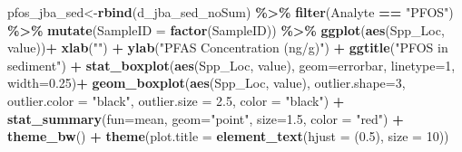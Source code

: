 \documentclass[
]{article}
\newenvironment{Shaded}{\begin{snugshade}}{\end{snugshade}}
\newcommand{\AttributeTok}[1]{\textcolor[rgb]{0.13,0.29,0.53}{#1}}
\newcommand{\DecValTok}[1]{\textcolor[rgb]{0.00,0.00,0.81}{#1}}
\newcommand{\FloatTok}[1]{\textcolor[rgb]{0.00,0.00,0.81}{#1}}
\newcommand{\FunctionTok}[1]{\textcolor[rgb]{0.13,0.29,0.53}{\textbf{#1}}}
\newcommand{\NormalTok}[1]{#1}
\newcommand{\OtherTok}[1]{\textcolor[rgb]{0.56,0.35,0.01}{#1}}
\newcommand{\SpecialCharTok}[1]{\textcolor[rgb]{0.81,0.36,0.00}{\textbf{#1}}}
\newcommand{\StringTok}[1]{\textcolor[rgb]{0.31,0.60,0.02}{#1}}
\begin{document}
\begin{Shaded}
\begin{Highlighting}[]
\NormalTok{pfos\_jba\_sed}\OtherTok{\textless{}{-}}\FunctionTok{rbind}\NormalTok{(d\_jba\_sed\_noSum) }\SpecialCharTok{\%\textgreater{}\%} 
  \FunctionTok{filter}\NormalTok{(Analyte }\SpecialCharTok{==} \StringTok{"PFOS"}\NormalTok{) }\SpecialCharTok{\%\textgreater{}\%} 
  \FunctionTok{mutate}\NormalTok{(}\AttributeTok{SampleID =} \FunctionTok{factor}\NormalTok{(SampleID)) }\SpecialCharTok{\%\textgreater{}\%} 
  \FunctionTok{ggplot}\NormalTok{(}\FunctionTok{aes}\NormalTok{(Spp\_Loc, value))}\SpecialCharTok{+}
    \FunctionTok{xlab}\NormalTok{(}\StringTok{""}\NormalTok{) }\SpecialCharTok{+}
    \FunctionTok{ylab}\NormalTok{(}\StringTok{"PFAS Concentration (ng/g)"}\NormalTok{) }\SpecialCharTok{+}
    \FunctionTok{ggtitle}\NormalTok{(}\StringTok{"PFOS in sediment"}\NormalTok{) }\SpecialCharTok{+}
    \FunctionTok{stat\_boxplot}\NormalTok{(}\FunctionTok{aes}\NormalTok{(Spp\_Loc, value),}
                 \AttributeTok{geom=}\StringTok{\textquotesingle{}errorbar\textquotesingle{}}\NormalTok{, }\AttributeTok{linetype=}\DecValTok{1}\NormalTok{, }\AttributeTok{width=}\FloatTok{0.25}\NormalTok{)}\SpecialCharTok{+}
    \FunctionTok{geom\_boxplot}\NormalTok{(}\FunctionTok{aes}\NormalTok{(Spp\_Loc, value),}
                 \AttributeTok{outlier.shape=}\DecValTok{3}\NormalTok{,}
                 \AttributeTok{outlier.color =} \StringTok{"black"}\NormalTok{,}
                 \AttributeTok{outlier.size =} \FloatTok{2.5}\NormalTok{,}
                 \AttributeTok{color =} \StringTok{"black"}\NormalTok{) }\SpecialCharTok{+} 
    \FunctionTok{stat\_summary}\NormalTok{(}\AttributeTok{fun=}\NormalTok{mean, }\AttributeTok{geom=}\StringTok{"point"}\NormalTok{, }\AttributeTok{size=}\FloatTok{1.5}\NormalTok{, }\AttributeTok{color =} \StringTok{"red"}\NormalTok{) }\SpecialCharTok{+}
    \FunctionTok{theme\_bw}\NormalTok{() }\SpecialCharTok{+}
    \FunctionTok{theme}\NormalTok{(}\AttributeTok{plot.title =} \FunctionTok{element\_text}\NormalTok{(}\AttributeTok{hjust =}\NormalTok{ (}\FloatTok{0.5}\NormalTok{), }\AttributeTok{size =} \DecValTok{10}\NormalTok{))}


\end{Highlighting}
\end{Shaded}
\end{document}
